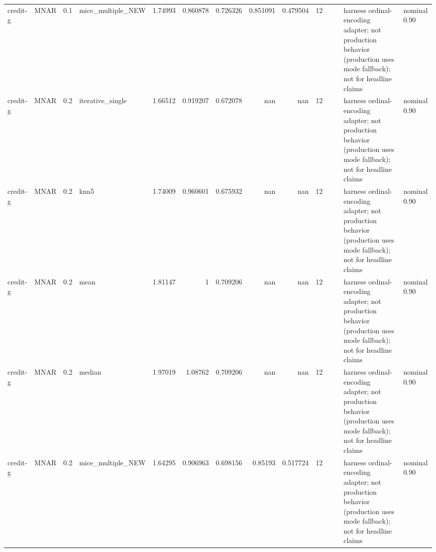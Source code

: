 \begin{table}[ht]
\begin{tabular}{llrlrrrrrrllll}
 credit-g             & MNAR        &         0.1 & mice\_multiple\_NEW &       1.74993  &             0.860878 &                 0.726326 &                       0.851091 &                         0.479504 &        12 &                    &                                         & harness ordinal-encoding adapter; not production behavior (production uses mode fallback); not for headline claims & nominal 0.90              \\
 credit-g             & MNAR        &         0.2 & iterative\_single  &       1.66512  &             0.919207 &                 0.672078 &                     nan        &                       nan        &        12 &                    &                                         & harness ordinal-encoding adapter; not production behavior (production uses mode fallback); not for headline claims & nominal 0.90              \\
 credit-g             & MNAR        &         0.2 & knn5              &       1.74009  &             0.960601 &                 0.675932 &                     nan        &                       nan        &        12 &                    &                                         & harness ordinal-encoding adapter; not production behavior (production uses mode fallback); not for headline claims & nominal 0.90              \\
 credit-g             & MNAR        &         0.2 & mean              &       1.81147  &             1        &                 0.709206 &                     nan        &                       nan        &        12 &                    &                                         & harness ordinal-encoding adapter; not production behavior (production uses mode fallback); not for headline claims & nominal 0.90              \\
 credit-g             & MNAR        &         0.2 & median            &       1.97019  &             1.08762  &                 0.709206 &                     nan        &                       nan        &        12 &                    &                                         & harness ordinal-encoding adapter; not production behavior (production uses mode fallback); not for headline claims & nominal 0.90              \\
 credit-g             & MNAR        &         0.2 & mice\_multiple\_NEW &       1.64295  &             0.906963 &                 0.698156 &                       0.85193  &                         0.517724 &        12 &                    &                                         & harness ordinal-encoding adapter; not production behavior (production uses mode fallback); not for headline claims & nominal 0.90              \\

\end{tabular}
\end{table}
